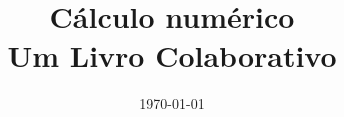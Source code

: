 \documentclass[twoside,11pt]{book}
\title{Cálculo numérico\\\small{Um Livro Colaborativo}}
\date{\today}
\author{}
\theoremstyle{plain}  %
\theoremstyle{remark}  %
\theoremstyle{definition}  %
\newcommand\summaryname{abstract}
\newenvironment{abstract}%
    {\small\begin{center}%
    \bfseries{\summaryname} \end{center}}
\begin{document}
\iflatexml
\begin{abstract}
  Este livro busca abordar os tópicos de um curso moderno de cálculo numérico em nível de graduação
\end{abstract}
\fi


\maketitle

\mainmatter






\iflatexml

\begin{lxFooter}
  Licença CC BY-SA 3.0 http://creativecommons.org/licenses/by-sa/3.0/
\end{lxFooter}
\fi

\mainmatter
 
 

%  
%  
%  
%  
 
 
%  
%  
 
 
 
%  
%  
 
 
%  
%  
 
%  
 
 

\iflatexml
\else
 
\fi


\nocite{*}





\backmatter

\printindex
\end{document}
